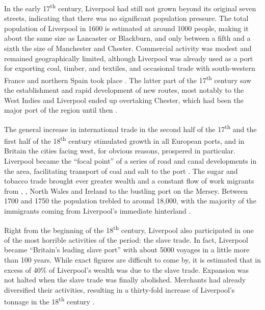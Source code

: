 In the early 17\textsuperscript{th} century, Liverpool had still not grown beyond its original seven streets, indicating that there was no significant population pressure.
The total population of Liverpool in 1600 is estimated at around 1000 people, making it about the same size as Lancaster or Blackburn, and only between a fifth and a sixth the size of Manchester and Chester.
Commercial activity was modest and remained geographically limited, although Liverpool was already used as a port for exporting  coal, timber, and textiles, and occasional trade with south-western France and northern Spain took place \parencite[cf.][72--76 and 81--84]{kermodeetal2006}.
The latter part of the 17\textsuperscript{th} century saw the establishment and rapid development of new routes, most notably to the West Indies and Liverpool ended up overtaking Chester, which had been the major port of the region until then \citep[cf.][107--110]{kermodeetal2006}.

The general increase in international trade in the second half of the 17\textsuperscript{th} and the first half of the 18\textsuperscript{th} century stimulated growth in all European ports, and in Britain the cities facing west, for obvious reasons, prospered in particular.
Liverpool became the ``focal point'' of a series of road and canal developments in the area, facilitating transport of  coal and  salt to the port \citep[129]{longmore2006}.
The sugar and tobacco trade brought ever greater wealth and a constant flow of work migrants from , , North Wales and Ireland to the bustling port on the Mersey.
Between 1700 and 1750 the population trebled to around 18,000, with the majority of the immigrants coming from Liverpool's immediate hinterland \citep[cf.][114--119 and 169]{longmore2006}.

Right from the beginning of the 18\textsuperscript{th} century, Liverpool also participated in one of the most horrible activities of the period: the slave trade.
In fact, Liverpool became ``Britain's leading slave port'' with about 5000 voyages in a little more than 100 years.
While exact figures are difficult to come by, it is estimated that in excess of 40\% of Liverpool's wealth was due to the slave trade.
Expansion was not halted when the slave trade was finally abolished.
Merchants had already diversified their activities, resulting in a thirty-fold increase of Liverpool's tonnage in the 18\textsuperscript{th} century \citep[cf.][131--134 and 137]{longmore2006}.

